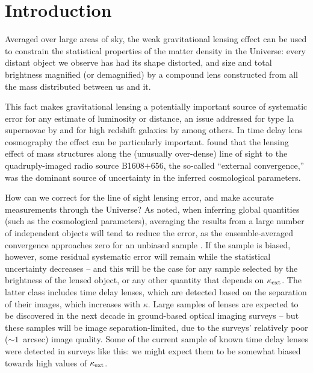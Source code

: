 \documentclass[useAMS,usenatbib]{mn2e}
\begin{document}

\section{Introduction}

Averaged over large areas of sky, the weak gravitational lensing effect can be
used to constrain the statistical properties of the matter density in the
Universe: every distant object we observe has had its shape distorted, and size
and total brightness magnified (or demagnified) by a compound lens constructed
from all the mass distributed between us and it.

This fact makes gravitational lensing a potentially important source of
systematic error for any estimate of luminosity or distance, an issue addressed
for \eg type Ia supernovae by \citet[][]{Holz+Wald,Linder+Holz} and for high
redshift galaxies by \citet{Loeb} among others. In time delay lens cosmography
the effect can be particularly important. \citet{Suyu2010} found that  the
lensing effect of mass structures along the (unusually over-dense)  line of
sight to the quadruply-imaged radio source B1608$+$656, the so-called ``external
convergence,'' was the dominant source of uncertainty in the inferred
cosmological parameters. 

How can we correct for the line of sight lensing error, and make accurate
measurements through the Universe? As \citeauthor{LH} noted, when inferring
global quantities (such as the cosmological parameters), averaging the results
from a large number of independent objects will tend to reduce the error, as the
ensemble-averaged convergence approaches zero for an unbiased sample
\citep{xxx}. If the sample is biased, however, some residual systematic error
will remain while the statistical uncertainty decreases -- and this will be the
case for any sample selected by the brightness of the lensed object, or any
other quantity that depends on $\kappa_{\rm ext}$. The latter class includes time delay
lenses, which are detected based on the separation of their images, which
increases with $\kappa$. Large samples of lenses are expected to be discovered
in the next decade in ground-based optical imaging surveys
\citep{Oguri+Marshll2010} -- but these samples will be image separation-limited,
due to the surveys' relatively poor ($\sim 1$~arcsec) image quality. Some of the
current sample of known time delay lenses were detected in surveys like this: we
might expect them to be somewhat biased towards high values of $\kappa_{\rm ext}$.
\end{document}
